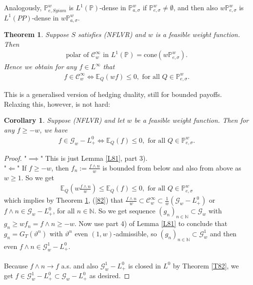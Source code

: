 \documentclass[12pt,a4paper, twoside]{article}
\newtheorem{thm}{Theorem}[section]
\newtheorem{cor}{Corollary}[section]
\theoremstyle{definition}
\newcommand{\EE}{\mathbb{E}} %
\newcommand{\PP}{\mathbb{P}} %
\begin{document}
\noindent Analogously, $\PP_{e, Sgiam}^w$ is $L^1(\PP)$-dense in $\PP_{a, \sigma}^w$ if $\PP_{e,\sigma}^w \neq \emptyset$, and then also $w\PP_{e, \sigma}^w$ is $L^1(PP)$-dense in $w\PP_{a, \sigma}^w$. 
\begin{thm} \label{T84} Suppose $S$ satisfies (NFLVR) and $w$ is a feasible weight function. Then 
\begin{align*} \label{81}
\text{polar of $\mathcal{C}_w^\infty$ in }L^1( \PP)=\text{cone}(w \PP_{e, \sigma}^w). \tag{9.1}
\end{align*}
Hence we obtain for any $f \in L^\infty$ that 
\begin{align*} \label{82}
f \in \mathcal{C}_w^\infty \iff \EE_Q(wf) \leq 0, \text{ for all } Q \in \PP_{e, \sigma}^w. \tag{9.2}
\end{align*}
\end{thm}
\newpage
This is a generalised version of hedging duality, still for bounded payoffs. Relaxing this, however, is not hard:
\begin{cor} \label{C85} Suppose (NFLVR) and let $w$ be a feasible weight function. Then for any $f \geq -w$, we have 
\begin{align*}
f \in \mathcal{G}_w-L_+^0 \iff \EE_Q(f) \leq 0, \text{ for all } Q \in \PP_{e, \sigma}^w.
\end{align*}
\end{cor}
\begin{proof}
"$\implies$" This is just Lemma \ref{L81}, part 3). \\
"$\Longleftarrow$" If $f \geq -w$, then $f_n := \frac{f \wedge n}{w}$ is bounded from below and also from above as $w \geq 1$. So we get 
\begin{align*}
\EE_Q\left( w \frac{f \wedge n}{w} \right) \leq \EE_Q(f) \leq 0, \text{ for all } Q \in \PP_{e, \sigma}^w
\end{align*}
which implies by Theorem \ref{T84}, (\ref{82}) that $\frac{f \wedge n}{w} \subset \mathcal{C}_w^\infty \subset \frac{1}{w}( \mathcal{G}_w - L_+^0)$ or $f \wedge n \in \mathcal{G}_w - L_+^0$, for all $n \in \mathbb{N}$. So we get sequence $(g_n)_{n \in \mathbb{N}} \subset \mathcal{G}_w$ with $g_n \geq w f_n = f \wedge n \geq -w$. Now use part 4) of Lemma \ref{L81} to conclude that $g_n = G_T( \vartheta^n)$ with $\vartheta^n$ even $(1,w)$-admissible, so $(g_n)_{n \in \mathbb{N}} \subset \mathcal{G}_w^1$ and then even $f \wedge n \in \mathcal{G}_w^1 - L_+^0$. 
\\\\
Because $f \wedge n \to f$ a.s. and also $\mathcal{G}_w^1- L_+^0$ is closed in $L^0$ by Theorem \ref{T82}, we get $f \in \mathcal{G}_w^1-L_+^0 \subset \mathcal{G}_w- L_+^0$ as desired. 
\end{proof}
\end{document}
